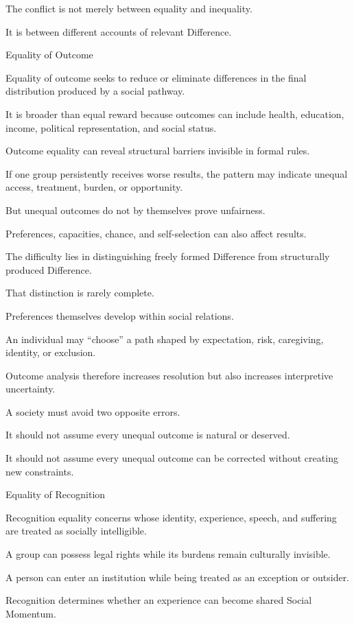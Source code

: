 The conflict is not merely between equality and inequality.

It is between different accounts of relevant Difference.

Equality of Outcome

Equality of outcome seeks to reduce or eliminate differences in the final distribution produced by a social pathway.

It is broader than equal reward because outcomes can include health, education, income, political representation, and social status.

Outcome equality can reveal structural barriers invisible in formal rules.

If one group persistently receives worse results, the pattern may indicate unequal access, treatment, burden, or opportunity.

But unequal outcomes do not by themselves prove unfairness.

Preferences, capacities, chance, and self-selection can also affect results.

The difficulty lies in distinguishing freely formed Difference from structurally produced Difference.

That distinction is rarely complete.

Preferences themselves develop within social relations.

An individual may “choose” a path shaped by expectation, risk, caregiving, identity, or exclusion.

Outcome analysis therefore increases resolution but also increases interpretive uncertainty.

A society must avoid two opposite errors.

It should not assume every unequal outcome is natural or deserved.

It should not assume every unequal outcome can be corrected without creating new constraints.

Equality of Recognition

Recognition equality concerns whose identity, experience, speech, and suffering are treated as socially intelligible.

A group can possess legal rights while its burdens remain culturally invisible.

A person can enter an institution while being treated as an exception or outsider.

Recognition determines whether an experience can become shared Social Momentum.

